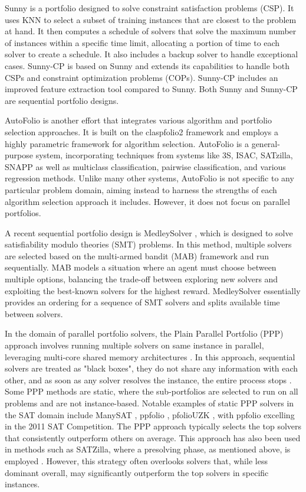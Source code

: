 Sunny \cite{sunny} is a portfolio designed to solve constraint satisfaction problems (CSP). It uses KNN to select a subset of training instances that are closest to the problem at hand. It then computes a schedule of solvers that solve the maximum number of instances within a specific time limit, allocating a portion of time to each solver to create a schedule. It also includes a backup solver to handle exceptional cases. Sunny-CP \cite{sunnycp} is based on Sunny and extends its capabilities to handle both CSPs and constraint optimization problems (COPs). Sunny-CP includes an improved feature extraction tool compared to Sunny. Both Sunny and Sunny-CP are sequential portfolio designs.

AutoFolio \cite{lindauer2015autofolio} is another effort that integrates various algorithm and portfolio selection approaches. It is built on the claspfolio2 framework and employs a highly parametric framework for algorithm selection. AutoFolio is a general-purpose system, incorporating techniques from systems like 3S, ISAC, SATzilla, SNAPP as well as multiclass classification, pairwise classification, and various regression methods. Unlike many other systems, AutoFolio is not specific to any particular problem domain, aiming instead to harness the strengths of each algorithm selection approach it includes. However, it does not focus on parallel portfolios.

A recent sequential portfolio design is MedleySolver \cite{10.1007/978-3-030-80223-3_31}, which is designed to solve satisfiability modulo theories (SMT) problems. In this method, multiple solvers are selected based on the multi-armed bandit (MAB) framework and run sequentially. MAB models a situation where an agent must choose between multiple options, balancing the trade-off between exploring new solvers and exploiting the best-known solvers for the highest reward. MedleySolver essentially provides an ordering for a sequence of SMT solvers and splits available time between solvers.

In the domain of parallel portfolio solvers, the Plain Parallel Portfolio (PPP) approach involves running multiple solvers on same instance in parallel, leveraging multi-core shared memory architectures \cite{conf/sat/AignerBKNP13}. In this approach, sequential solvers are treated as "black boxes", they do not share any information with each other, and as soon as any solver resolves the instance, the entire process stops \cite{conf/sat/AignerBKNP13, Marius2015}. Some PPP methods are static, where the sub-portfolios are selected to run on all problems and are not instance-based. Notable examples of static PPP solvers in the SAT domain include ManySAT \cite{Hamadi2009}, ppfolio \cite{ppfolio}, pfolioUZK \cite{wotzlawpfoliouzk}, with ppfolio excelling in the 2011 SAT Competition. The PPP approach typically selects the top solvers that consistently outperform others on average. This approach has also been used in methods such as SATZilla, where a presolving phase, as mentioned above, is employed \cite{satzilla}. However, this strategy often overlooks solvers that, while less dominant overall, may significantly outperform the top solvers in specific instances. 


